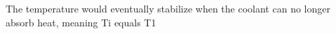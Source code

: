 The temperature would eventually stabilize when the coolant can no longer absorb heat, meaning Ti equals T1